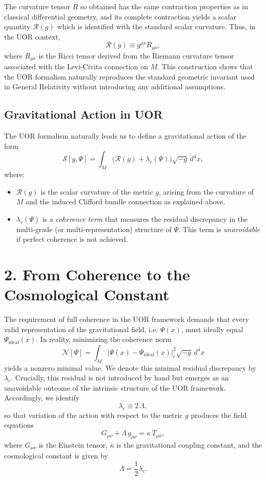 \documentclass[12pt]{article}
\begin{document}
The curvature tensor \(R\) so obtained has the same contraction properties as in classical differential geometry, and its complete contraction yields a scalar quantity \(\mathcal{R}(g)\) which is identified with the standard scalar curvature. Thus, in the UOR context, 
\[
\mathcal{R}(g) \equiv g^{\mu\nu}R_{\mu\nu},
\]
where \(R_{\mu\nu}\) is the Ricci tensor derived from the Riemann curvature tensor associated with the Levi-Civita connection on \(M\). This construction shows that the UOR formalism naturally reproduces the standard geometric invariant used in General Relativity without introducing any additional assumptions.

\subsection*{Gravitational Action in UOR}
The UOR formalism naturally leads us to define a gravitational action of the form
\[
\mathcal{S}[g,\Psi] = \int_M \Big( \mathcal{R}(g) + \lambda_c(\Psi) \Big) \sqrt{-g}\, d^4x,
\]
where:
\begin{itemize}
    \item \(\mathcal{R}(g)\) is the scalar curvature of the metric \(g\), arising from the curvature of \(M\) and the induced Clifford bundle connection as explained above.
    \item \(\lambda_c(\Psi)\) is a \emph{coherence term} that measures the residual discrepancy in the multi-grade (or multi-representation) structure of \(\Psi\). This term is \emph{unavoidable} if perfect coherence is not achieved.
\end{itemize}

\section*{2. From Coherence to the Cosmological Constant}
The requirement of full coherence in the UOR framework demands that every valid representation of the gravitational field, i.e. \(\Psi(x)\), must ideally equal \(\Psi_{\mathrm{ideal}}(x)\). In reality, minimizing the coherence norm
\[
\mathcal{N}[\Psi] = \int_M \lvert \Psi(x) - \Psi_{\mathrm{ideal}}(x)\rvert_c^2 \sqrt{-g}\, d^4x
\]
yields a nonzero minimal value. We denote this minimal residual discrepancy by \(\lambda_c\). Crucially, this residual is not introduced by hand but emerges as an unavoidable outcome of the intrinsic structure of the UOR framework. Accordingly, we identify
\[
\lambda_c \equiv 2\,\Lambda,
\]
so that variation of the action with respect to the metric \(g\) produces the field equations
\[
G_{\mu\nu} + \Lambda\,g_{\mu\nu} = \kappa\, T_{\mu\nu},
\]
where \(G_{\mu\nu}\) is the Einstein tensor, \(\kappa\) is the gravitational coupling constant, and the cosmological constant is given by
\[
\Lambda = \frac{1}{2}\lambda_c.
\]
\end{document}
